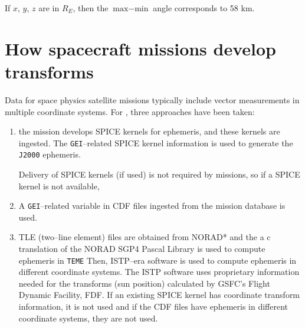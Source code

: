 \documentclass[draft]{agujournal2019}
\begin{document}
\noindent
If $x$, $y$, $z$ are in $R_E$, then the $\mbox{max}-\mbox{min}$ angle corresponds to 58 km.


\section{How spacecraft missions develop transforms}
\label{sect:missions}

Data for space physics satellite missions typically include vector measurements in multiple coordinate systems. For , three approaches have been taken:

\begin{enumerate}
    \parskip 0.1in 

    \item the mission develops SPICE kernels for ephemeris, and these kernels are ingested. The \texttt{GEI}--related SPICE kernel information is used to generate the \texttt{J2000} ephemeris.

    Delivery of SPICE kernels (if used) is not required by missions, so if a SPICE kernel is not available,

    \item A \texttt{GEI}--related variable in CDF files ingested from the mission database is used.

    \item TLE (two--line element) files are obtained from NORAD* and the a c translation of the NORAD SGP4 Pascal Library \cite{NORADSGP4c} is used to compute ephemeris in \texttt{TEME} Then, ISTP--era software is used to compute ephemeris in different coordinate systems. The ISTP software uses proprietary information needed for the transforms (sun position) calculated by GSFC's Flight Dynamic Facility, FDF. If an existing SPICE kernel has coordinate transform information, it is not used and if the CDF files have ephemeris in different coordinate systems, they are not used.

\end{enumerate}
\end{document}
